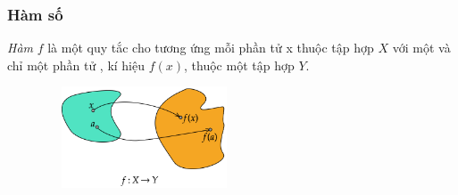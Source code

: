 
\begin{frame}
\frametitle{Hàm số }
    \begin{tcolorbox}[colback=blue!10!, colframe=blue!50!black, title=Định nghĩa]
        \textit{Hàm} $f$ là một quy tắc cho tương ứng mỗi phần tử x thuộc tập hợp $X$ với một và chỉ một phần tử , kí hiệu $f(x)$, thuộc một tập hợp $Y$.
    \end{tcolorbox}
     \begin{figure}
      \centering
      \includegraphics[width=6cm, height= 3cm]{Slides/figure/anhxa - Copy.png}
     \end{figure}
\end{frame}

